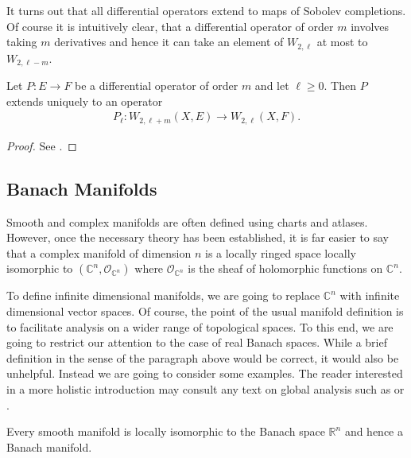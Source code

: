 \documentclass[12pt]{ociamthesis}  %
\begin{document}
It turns out that all differential operators extend to maps of Sobolev
completions. Of course it is intuitively clear, that a differential
operator of order $m$ involves taking $m$ derivatives and hence
it can take an element of $W_{2,\ell}$ at most to $W_{2,\ell-m}$.

\begin{theorem}
  Let $P:E\to F$ be a differential operator of order $m$ and
  let $\ell \geq 0$. Then $P$ extends uniquely to an operator
  \begin{align}\label{eq:fredholm_extension}
    P_\ell : W_{2,\ell+m}(X,E) \to W_{2,\ell}(X,F).
  \end{align}
  \begin{proof}
    See \cite[{Proposition 3.8.4}]{bc2009}.
  \end{proof}
\end{theorem}

\subsection{Banach Manifolds}

Smooth and complex manifolds are often defined using charts and
atlases. However, once the necessary theory has been established,
it is far easier to say that a complex manifold
of dimension $n$ is a locally ringed space locally isomorphic to
$(\mathbb{C}^n,\mathcal O_{\mathbb{C}^n})$ where
$\mathcal O_{\mathbb{C}^n}$ is the sheaf of holomorphic functions on
$\mathbb{C}^n$.

To define infinite dimensional manifolds, we are going to replace
$\mathbb{C}^n$ with infinite dimensional vector spaces. Of course,
the point of the usual manifold definition is to facilitate analysis
on a wider range of topological spaces. To this end, we are going to
restrict our attention to the case of real Banach spaces. While a brief
definition in the sense of the paragraph above would be correct,
it would also be unhelpful. Instead we are going to consider some
examples. The reader interested in a more holistic
introduction may consult any text on global analysis such
as \cite[Chapter 7]{kahn1982} or \cite{bc2009}.

\begin{example}
  Every smooth manifold is locally isomorphic to
  the Banach space $\mathbb R^n$ and hence a Banach manifold.
\end{example}
\end{document}
